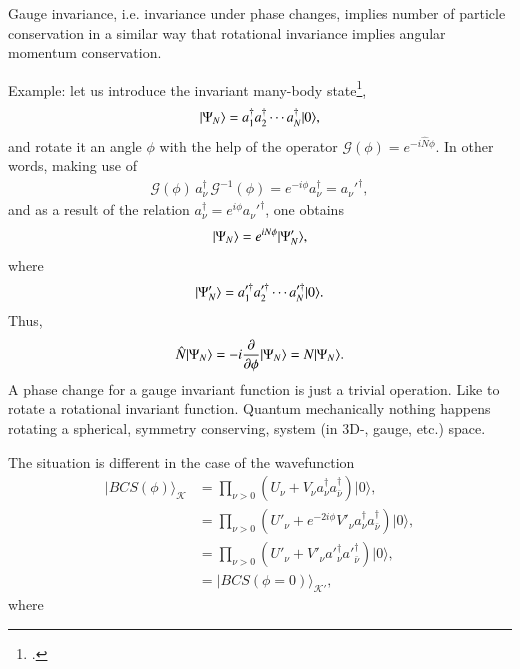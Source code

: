  Gauge invariance, 
  i.e. invariance under phase changes, implies number of particle conservation in a similar way that rotational invariance implies angular momentum conservation.

Example: let us introduce the  invariant many-body state\footnote{\cite{Anderson:64b}.},
\begin{align}\label{eq3.7.12}
|{\Psi_N} \rangle=a_1^\dagger a_2^\dagger\dotsb a_N^\dagger |{0} \rangle,
\end{align}
and rotate it an angle $\phi$ with the help of the operator $\mathcal G(\phi)=e^{-i\hat N\phi}$. In other words, making use of
\begin{align}\label{eq3.7.15}
\mathcal G(\phi)\,a_\nu^\dagger\, \mathcal G^{-1}(\phi)=e^{-i\phi}a_\nu^\dagger=a_\nu'^\dagger,
\end{align}
and as a result of the relation $a_\nu^\dagger=e^{i\phi}a_\nu'^\dagger$, one obtains
\begin{align}\label{eq3.7.13}
|{\Psi_N} \rangle=e^{iN\phi}|{\Psi'_N} \rangle,
\end{align}
where
\begin{align}\label{eq3.7.14}
|{\Psi'_N} \rangle=a_1'^\dagger a_2'^\dagger\dotsb a_N'^\dagger|{0} \rangle.
\end{align}
Thus,
\begin{align}\label{eq3.7.17}
\hat N|{\Psi_N} \rangle=-i\frac{\partial}{\partial \phi}|{\Psi_N} \rangle=N|{\Psi_N} \rangle.
\end{align}
 A phase change for a gauge invariant function is just a trivial operation. Like to rotate a rotational invariant function. Quantum mechanically nothing happens rotating a spherical, symmetry conserving, system (in 3D-, gauge, etc.) space.


The situation is  different in the case of the wavefunction   
\begin{align}\label{eq3.7.7}
\nonumber|BCS(\phi)\rangle_{\mathcal{K}} &=\prod_{\nu>0}\left(U_\nu+V_\nu a_\nu^\dagger a_{\bar \nu}^{\dagger}\right)|0\rangle,\\
\nonumber&=\prod_{\nu>0}\left(U'_\nu+e^{-2i\phi}V'_\nu a^\dagger_\nu a^{\dagger}_{\bar \nu}\right)|0\rangle,\\
\nonumber&=\prod_{\nu>0}\left(U'_\nu+V'_\nu a'^\dagger_\nu a'^{\dagger}_{\bar \nu}\right)|0\rangle,\\
&=|BCS(\phi=0)\rangle_{\mathcal{K'}},
\end{align}
where  

